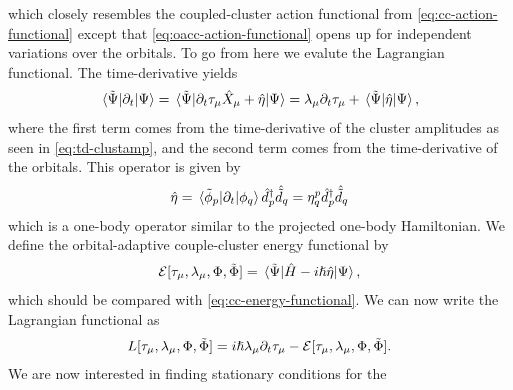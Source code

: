             which closely resembles the coupled-cluster action functional from
            \autoref{eq:cc-action-functional} except that
            \autoref{eq:oacc-action-functional} opens up for independent
            variations over the orbitals.
            To go from here we evalute the Lagrangian functional.
            The time-derivative yields
            \begin{align}
                \mel*{\tilde{\Psi}}{\partial_t}{\Psi}
                =
                \mel*{\tilde{\Psi}}{
                    \partial_t \tau_{\mu}\hat{X}_{\mu}
                    +
                    \hat{\eta}
                }{\Psi}
                =
                \lambda_{\mu}\partial_t\tau_{\mu}
                + \mel*{\tilde{\Psi}}{\hat{\eta}}{\Psi},
            \end{align}
            where the first term comes from the time-derivative of the cluster
            amplitudes as seen in \autoref{eq:td-clustamp}, and the second term
            comes from the time-derivative of the orbitals.
            This operator is given by
            \begin{align}
                \hat{\eta}
                = \mel*{\tilde{\phi}_p}{\partial_t}{\phi_q}
                \hat{d}^{\dagger}_{p}\hat{\tilde{d}}_{q}
                = \eta^{p}_{q}\hat{d}^{\dagger}_{p}\hat{\tilde{d}}_{q}
            \end{align}
            which is a one-body operator similar to the projected one-body
            Hamiltonian.
            We define the orbital-adaptive couple-cluster energy functional by
            \begin{align}
                \mathcal{E}[
                    \tau_{\mu}, \lambda_{\mu}, \Phi, \tilde{\Phi}
                ]
                = \mel*{\tilde{\Psi}}{
                    \hat{H} - i\hslash\hat{\eta}
                }{\Psi},
            \end{align}
            which should be compared with \autoref{eq:cc-energy-functional}.
            We can now write the Lagrangian functional as
            \begin{align}
                L[\tau_{\mu}, \lambda_{\mu}, \Phi, \tilde{\Phi}]
                =
                i\hslash\lambda_{\mu}\partial_t\tau_{\mu}
                -
                \mathcal{E}[
                    \tau_{\mu}, \lambda_{\mu}, \Phi, \tilde{\Phi}
                ].
            \end{align}
            We are now interested in finding stationary conditions for the
